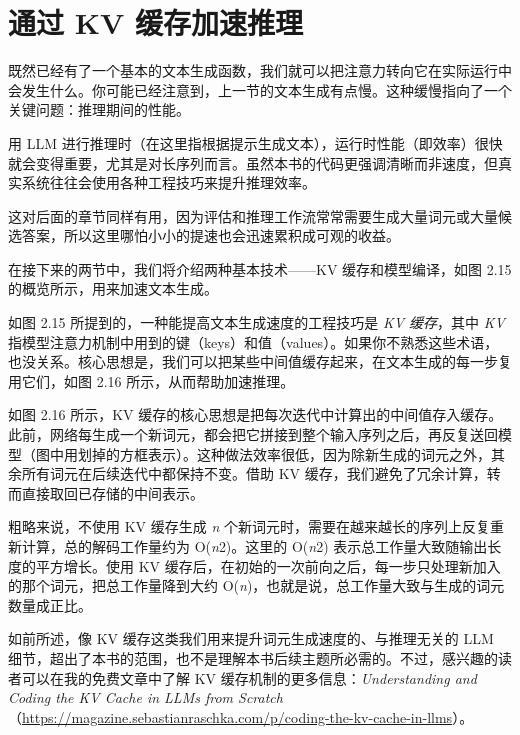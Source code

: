 \section{通过 KV 缓存加速推理}

既然已经有了一个基本的文本生成函数，我们就可以把注意力转向它在实际运行中会发生什么。你可能已经注意到，上一节的文本生成有点慢。这种缓慢指向了一个关键问题：推理期间的性能。

用 LLM 进行推理时（在这里指根据提示生成文本），运行时性能（即效率）很快就会变得重要，尤其是对长序列而言。虽然本书的代码更强调清晰而非速度，但真实系统往往会使用各种工程技巧来提升推理效率。

这对后面的章节同样有用，因为评估和推理工作流常常需要生成大量词元或大量候选答案，所以这里哪怕小小的提速也会迅速累积成可观的收益。

在接下来的两节中，我们将介绍两种基本技术——KV 缓存和模型编译，如图 2.15 的概览所示，用来加速文本生成。


如图 2.15 所提到的，一种能提高文本生成速度的工程技巧是 \emph{KV 缓存}，其中 \emph{KV} 指模型注意力机制中用到的键（keys）和值（values）。如果你不熟悉这些术语，也没关系。核心思想是，我们可以把某些中间值缓存起来，在文本生成的每一步复用它们，如图 2.16 所示，从而帮助加速推理。

如图 2.16 所示，KV 缓存的核心思想是把每次迭代中计算出的中间值存入缓存。此前，网络每生成一个新词元，都会把它拼接到整个输入序列之后，再反复送回模型（图中用划掉的方框表示）。这种做法效率很低，因为除新生成的词元之外，其余所有词元在后续迭代中都保持不变。借助 KV 缓存，我们避免了冗余计算，转而直接取回已存储的中间表示。


粗略来说，不使用 KV 缓存生成 \emph{n} 个新词元时，需要在越来越长的序列上反复重新计算，总的解码工作量约为 O(\emph{n}2)。这里的 O(\emph{n}2) 表示总工作量大致随输出长度的平方增长。使用 KV 缓存后，在初始的一次前向之后，每一步只处理新加入的那个词元，把总工作量降到大约 O(\emph{n})，也就是说，总工作量大致与生成的词元数量成正比。

如前所述，像 KV 缓存这类我们用来提升词元生成速度的、与推理无关的 LLM 细节，超出了本书的范围，也不是理解本书后续主题所必需的。不过，感兴趣的读者可以在我的免费文章中了解 KV 缓存机制的更多信息：\emph{Understanding and Coding the KV Cache in LLMs from Scratch}（\href{https://magazine.sebastianraschka.com/p/coding-the-kv-cache-in-llms}{https://magazine.sebastianraschka.com/p/coding-the-kv-cache-in-llms}）。

